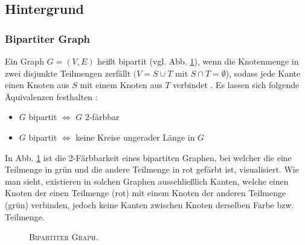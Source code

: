 \subsection{Hintergrund}

\subsubsection{Bipartiter Graph}
\label{sec:digression_bipartite_graph}

Ein Graph $G = (V, E)$ heißt bipartit (vgl. Abb. \ref{fig:digression_bipartite_graph}), wenn die Knotenmenge in zwei disjunkte Teilmengen zerfällt
$(V = S \cup T$ mit $S \cap T = \emptyset$), sodass jede Kante einen Knoten aus $S$ mit einem Knoten aus $T$ verbindet \cite{HochschuleDarmstadt}.\newline
Es lassen sich folgende Äquivalenzen festhalten \cite{Leighton2010}:
\begin{itemize}
  \item $G$ bipartit $\iff$ $G$ 2-färbbar
  \item $G$ bipartit $\iff$ keine Kreise ungerader Länge in $G$
\end{itemize}
In Abb. \ref{fig:digression_bipartite_graph} ist die 2-Färbbarkeit eines bipartiten Graphen, bei welcher die eine Teilmenge
in grün und die andere Teilmenge in rot gefärbt ist, visualisiert. Wie man sieht, existieren in solchen Graphen
ausschließlich Kanten, welche einen Knoten der einen Teilmenge (rot) mit einem Knoten der anderen Teilmenge (grün) verbinden,
jedoch keine Kanten zwischen Knoten derselben Farbe bzw. Teilmenge.

\begin{figure}[H]
\centering
{}
\caption{\textsc{Bipartiter Graph.}}
\label{fig:digression_bipartite_graph}
\end{figure}

